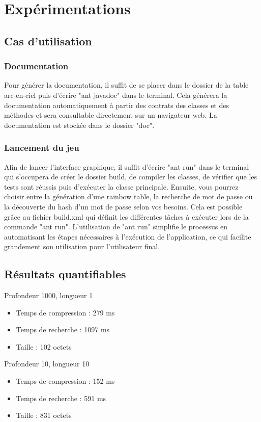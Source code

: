 \documentclass[a4paper,12pt]{article}
\begin{document}
\section{Expérimentations}
\subsection{Cas d’utilisation}
\subsubsection{Documentation}

Pour générer la documentation, il suffit de se placer dans le dossier de la table arc-en-ciel puis d'écrire "ant javadoc" dans le terminal. Cela générera la documentation automatiquement à partir des contrats des classes et des méthodes et sera consultable directement sur un navigateur web. La documentation est stockée dans le dossier "doc".

\subsubsection{Lancement du jeu}

Afin de lancer l'interface graphique, il suffit d'écrire "ant run" dans le terminal qui s'occupera de créer le dossier build, de compiler les classes, de vérifier que les tests sont réussis puis d'exécuter la classe principale. Ensuite, vous pourrez choisir entre la génération d'une rainbow table, la recherche de mot de passe ou la découverte du hash d'un mot de passe selon vos besoins. Cela est possible grâce au fichier build.xml qui définit les différentes tâches à exécuter lors de la commande "ant run". L'utilisation de "ant run" simplifie le processus en automatisant les étapes nécessaires à l'exécution de l'application, ce qui facilite grandement son utilisation pour l'utilisateur final. 

\subsection{Résultats quantifiables}
Profondeur 1000, longueur 1
\begin{itemize}
    \item Temps de compression : 279 ms
    \item Temps de recherche : 1097 ms
    \item Taille : 102 octets
\end{itemize}

Profondeur 10, longueur 10
\begin{itemize}
    \item Temps de compression : 152 ms
    \item Temps de recherche : 591 ms
    \item Taille : 831 octets
\end{itemize}
\end{document}
